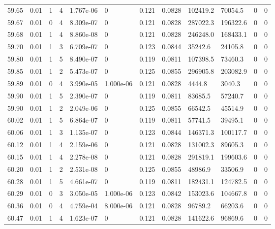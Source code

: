 \documentclass[preview]{standalone}
\begin{document}
{{{{{{{{{{{{{{{{{\begin{tabular}{L{1.2cm}C{1.2cm} C{0.3cm}C{0.5cm} C{1.4cm}C{1.4cm} C{1.4cm}C{1.4cm} C{1.6cm}C{1.6cm} C{1.6cm}C{1.6cm}}
  59.65  &  0.01  & 1     &  4 &  1.767e-06  & 0  &  0.121&   0.0828& 102419.2 & 70054.5   &  0 & 0  \\ 
  59.67  &  0.01  & 0     &  4 &  8.309e-07  & 0  &  0.121&   0.0828& 287022.3 & 196322.6   &  0 & 0  \\ 
  59.68  &  0.01  & 1     &  4 &  8.860e-08  & 0  &  0.121&   0.0828& 246248.0 & 168433.1   &  0 & 0  \\ 
  59.70  &  0.01  & 1     &  3 &  6.709e-07  & 0  &  0.123&   0.0844& 35242.6 & 24105.8   &  0 & 0  \\ 
  59.80  &  0.01  & 1     &  5 &  8.490e-07  & 0  &  0.119&   0.0811& 107398.5 & 73460.3   &  0 & 0  \\ 
  59.85  &  0.01  & 1     &  2 &  5.473e-07  & 0  &  0.125&   0.0855& 296905.8 & 203082.9   &  0 & 0  \\ 
  59.89  &  0.01  & 0     &  4 &  3.990e-05  & 1.000e-06  &  0.121&   0.0828& 4444.8 & 3040.3   &  0 & 0  \\ 
  59.90  &  0.01  & 1     &  5 &  2.390e-07  & 0  &  0.119&   0.0811& 83685.5 & 57240.7   &  0 & 0  \\ 
  59.90  &  0.01  & 1     &  2 &  2.049e-06  & 0  &  0.125&   0.0855& 66542.5 & 45514.9   &  0 & 0  \\ 
  60.02  &  0.01  & 1     &  5 &  6.864e-07  & 0  &  0.119&   0.0811& 57741.5 & 39495.1   &  0 & 0  \\ 
  60.06  &  0.01  & 1     &  3 &  1.135e-07  & 0  &  0.123&   0.0844& 146371.3 & 100117.7   &  0 & 0  \\ 
  60.12  &  0.01  & 1     &  4 &  2.159e-06  & 0  &  0.121&   0.0828& 131002.3 & 89605.3   &  0 & 0  \\ 
  60.15  &  0.01  & 1     &  4 &  2.278e-08  & 0  &  0.121&   0.0828& 291819.1 & 199603.6   &  0 & 0  \\ 
  60.20  &  0.01  & 1     &  2 &  2.531e-08  & 0  &  0.125&   0.0855& 48986.9 & 33506.9   &  0 & 0  \\ 
  60.28  &  0.01  & 1     &  5 &  4.661e-07  & 0  &  0.119&   0.0811& 182431.1 & 124782.5   &  0 & 0  \\ 
  60.29  &  0.01  & 0     &  3 &  3.050e-05  & 1.000e-06  &  0.123&   0.0842& 153023.6 & 104667.8   &  0 & 0  \\ 
  60.36  &  0.01  & 0     &  4 &  4.759e-04  & 8.000e-06  &  0.121&   0.0828& 96789.2 & 66203.6   &  0 & 0  \\ 
  60.47  &  0.01  & 1     &  4 &  1.623e-07  & 0  &  0.121&   0.0828& 141622.6 & 96869.6   &  0 & 0  \\ 

\end{tabular}}}}}}}}}}}}}}}}}}
\end{document}
